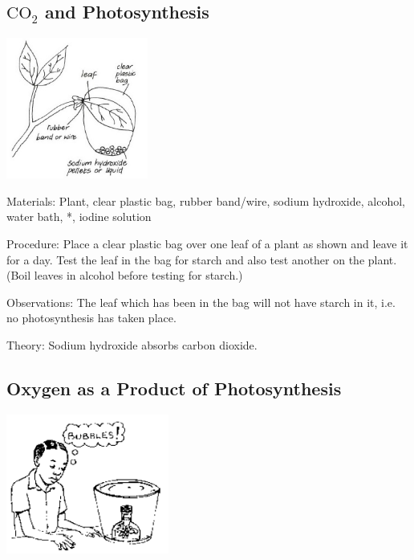 \begin{multicols}{2}
\subsection{$\mathrm{CO_2}$ and Photosynthesis} %

\begin{center}
\includegraphics[width=0.35\textwidth]{./img/vso/co2-photo.jpg}
\end{center}

\begin{description*}
\item[Materials:]{Plant, clear plastic bag, rubber band/wire, sodium hydroxide, alcohol, water bath, *, iodine solution}
\item[Procedure:]{Place a clear plastic bag over one
leaf of a plant as shown and leave
it for a day. Test the leaf in the
bag for starch and also test
another on the plant. (Boil leaves
in alcohol before testing for
starch.) }
\item[Observations:]{The leaf which has been
in the bag will not have starch in
it, i.e. no photosynthesis has
taken place.}
\item[Theory:]{Sodium hydroxide absorbs carbon dioxide.}
\end{description*}

\subsection{Oxygen as a Product of Photosynthesis} %

\begin{center}
\includegraphics[width=0.4\textwidth]{./img/source/photo-gas.png}
\end{center}


\end{multicols}
